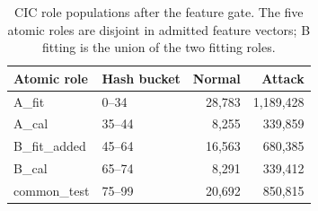 \begin{table}[!htbp]

\color{RevisionBlue}
\captionsetup{font+=revisionblue}
\caption{CIC role populations after the feature gate. The five atomic roles are disjoint in admitted feature vectors; B fitting is the union of the two fitting roles.}\label{tab:cic-roles}
\centering\small
\begin{tabular}{llrr}
\toprule Atomic role & Hash bucket & Normal & Attack\\
\midrule
A\_fit & 0--34 & 28,783 & 1,189,428\\
A\_cal & 35--44 & 8,255 & 339,859\\
B\_fit\_added & 45--64 & 16,563 & 680,385\\
B\_cal & 65--74 & 8,291 & 339,412\\
common\_test & 75--99 & 20,692 & 850,815\\
\bottomrule\end{tabular}

\end{table}
